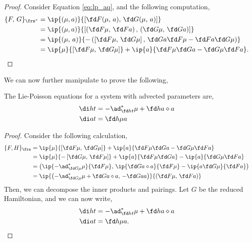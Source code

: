 \begin{proof}
  Consider Equation \ref{eq:lp_aq}, and the following computation,
  \begin{align*}
    \{F,\, G\}_{\frs^*} &= \ip{(\mu, a)}{\left[ \fd F {(\mu,\, a)},\, \fd G {(\mu,\, a)} \right]} \\
    &= \ip{(\mu, a)}{\left[ \left( \fd F \mu,\, \fd F a \right),\, \left( \fd G \mu,\, \fd G a \right) \right]} \\
    &= \ip{(\mu,\, a)}{-\left( \left[\fd F \mu,\, \fd G \mu\right],\,\fd G a\fd F \mu - \fd F a\fd G \mu \right)} \\
    &= \ip{\mu}{\left[ \fd F \mu,\, \fd G \mu \right]} + \ip{a}{\fd F \mu\fd G a - \fd G \mu\fd F a}.
  \end{align*}
\end{proof}

\noindent
We can now further manipulate to prove the following,
\begin{nthm}
  The Lie-Poisson equations for a system with advected parameters are,
  \begin{equation}
    \begin{split}
      \di h t &= -\ad^*_{\fd h t} \mu + \fd h a \diamond a \\
      \di a t &= \fd h \mu a
    \end{split}
  \end{equation}
\end{nthm}
\begin{proof}
  Consider the following calculation,
  \begin{align*}
        \{F, H\}_\frs &= \ip{\mu}{\left[ \fd F \mu,\, \fd G \mu \right]} + \ip{a}{\fd F \mu\fd G a - \fd G \mu\fd F a}\\
        &= \ip{\mu}{-\left[ \fd G \mu,\, \fd F \mu \right]} + \ip{a}{\fd F \mu\fd G a} - \ip{a}{\fd G \mu\fd F a}\\
        &= \left( \ip{-\ad^*_{\fd G \mu} \mu}{\fd F \mu},\, \ip{\fd G a \diamond a}{\fd F \mu} - \ip{a\fd G \mu}{\fd F a} \right)\\
        &= \ip{\left( - \ad^*_{\fd G \mu}\mu + \fd G a \diamond a,\, -\fd G a a \right)}{\left( \fd F\mu,\, \fd F a \right)}
  \end{align*}
  Then, we can decompose the inner products and pairings. Let $G$ be the reduced Hamiltonian, and we can now write,
  \begin{equation}
    \begin{split}
      \di h t &= -\ad^*_{\fd h t} \mu + \fd h a \diamond a \\
      \di a t &= \fd h \mu a.
    \end{split}
  \end{equation}
\end{proof}